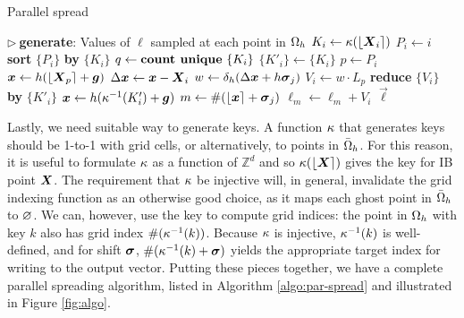 \begin{algorithm}
\caption{Parallel spread}
\label{algo:par-spread}
\begin{algorithmic}[1]
\State $\triangleright\ $\textbf{generate}: Values of $\ell$ sampled at each point in $\Omega_h$
 \label{line:par-spread-ps}
    \Statex {}
    \State $K_i \gets \kappa(\left\lfloor{\boldsymbol{X}_i}\right\rceil)$ 
    \State $P_i \gets i$ 
\EndFor
\State \textbf{sort} $\{P_i\}$ \textbf{by} $\{K_i\}$ \label{line:par-spread-sort}  
\State $q \gets \text{\textbf{count unique} }\{K_i\}$ \label{line:par-spread-q}
 \label{line:par-spread-shifts} 
    \State $\{K'_i\} \gets \{K_i\}$
     \label{line:par-spread-v}
        \Statex {}
        \State $p \gets P_i$
        \State $\boldsymbol{x} \gets h(\left\lfloor{\boldsymbol{X}_p}\right\rceil+\boldsymbol{g})$
        \State $\Delta\boldsymbol{x} \gets \boldsymbol{x}-\boldsymbol{X}_i$
        \State $w \gets \delta_h(\Delta\boldsymbol{x}+h\boldsymbol{\sigma}_j)$
        \State $V_i \gets w \cdot L_p$
    \EndFor \label{line:par-spread-vend}
    \State \textbf{reduce} $\{V_i\}$ \textbf{by} $\{K'_i\}$ \label{line:par-spread-reduce} 
     \label{line:par-spread-quse}
        \Statex{}
        \State $\boldsymbol{x} \gets h(\kappa^{-1}(K'_i) + \boldsymbol{g})$
        \State $m \gets \#(\left\lfloor{\boldsymbol{x}}\right\rceil + \boldsymbol{\sigma}_j)$ 
            \State $\ell_m \gets \ell_m + V_i$
        \EndIf
    \EndFor \label{line:par-spread-wend}
\EndFor
\State \Return $\vec{\ell}$
\EndProcedure
\end{algorithmic}
\end{algorithm}



Lastly, we need suitable way to generate keys. A function $\kappa$ that generates keys
should be 1-to-1 with grid cells, or alternatively, to points in $\bar{\Omega}_h$. For
this reason, it is useful to formulate $\kappa$ as a function of $\mathbb{Z}^d$ and so
$\kappa(\left\lfloor{\boldsymbol{X}}\right\rceil)$ gives the key for IB point $\boldsymbol{X}$. The requirement that $\kappa$ be
injective will, in general, invalidate the grid indexing function as an otherwise good
choice, as it maps each ghost point in $\bar{\Omega}_h$ to $\varnothing$. We can, however,
use the key to compute grid indices: the point in $\Omega_h$ with key $k$ also has grid
index $\#(\kappa^{-1}(k))$. Because $\kappa$ is injective, $\kappa^{-1}(k)$ is well-defined,
and for shift $\boldsymbol{\sigma}$, $\#(\kappa^{-1}(k)+\boldsymbol{\sigma})$ yields the appropriate target index for
writing to the output vector. Putting these pieces together, we have a complete parallel
spreading algorithm, listed in Algorithm \ref{algo:par-spread} and illustrated in Figure
\ref{fig:algo}.

